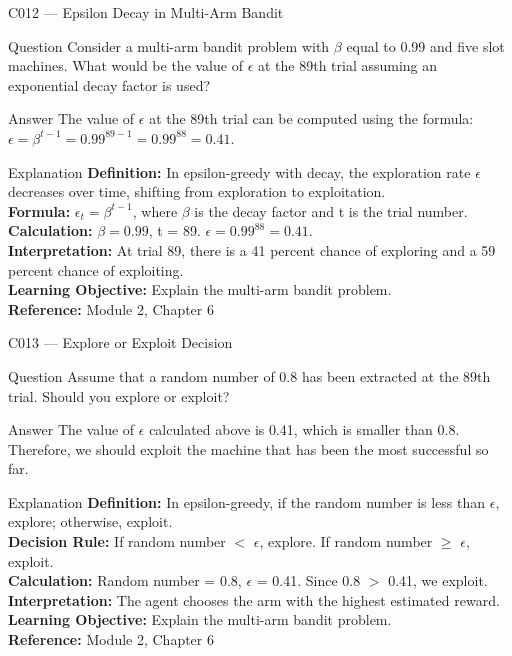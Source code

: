 \documentclass[aspectratio=169,8pt]{beamer}
\begin{document}
	\begin{frame}{C012 --- Epsilon Decay in Multi-Arm Bandit}
		\begin{block}{Question}
			Consider a multi-arm bandit problem with $\beta$ equal to 0.99 and five slot machines. What would be the value of $\epsilon$ at the 89th trial assuming an exponential decay factor is used?
		\end{block}
		\begin{block}{Answer}
			The value of $\epsilon$ at the 89th trial can be computed using the formula: $\epsilon = \beta^{t-1} = 0.99^{89-1} = 0.99^{88} = 0.41$.
		\end{block}
		\begin{block}{Explanation}
			\textbf{Definition:} In epsilon-greedy with decay, the exploration rate $\epsilon$ decreases over time, shifting from exploration to exploitation.\\
			\textbf{Formula:} $\epsilon_t = \beta^{t-1}$, where $\beta$ is the decay factor and t is the trial number.\\
			\textbf{Calculation:} $\beta = 0.99$, t = 89. $\epsilon = 0.99^{88} = 0.41$.\\
			\textbf{Interpretation:} At trial 89, there is a 41 percent chance of exploring and a 59 percent chance of exploiting.\\
			\textbf{Learning Objective:} Explain the multi-arm bandit problem.\\
			\textbf{Reference:} Module 2, Chapter 6
		\end{block}
	\end{frame}
	
	\begin{frame}{C013 --- Explore or Exploit Decision}
		\begin{block}{Question}
			Assume that a random number of 0.8 has been extracted at the 89th trial. Should you explore or exploit?
		\end{block}
		\begin{block}{Answer}
			The value of $\epsilon$ calculated above is 0.41, which is smaller than 0.8. Therefore, we should exploit the machine that has been the most successful so far.
		\end{block}
		\begin{block}{Explanation}
			\textbf{Definition:} In epsilon-greedy, if the random number is less than $\epsilon$, explore; otherwise, exploit.\\
			\textbf{Decision Rule:} If random number $<$ $\epsilon$, explore. If random number $\geq$ $\epsilon$, exploit.\\
			\textbf{Calculation:} Random number = 0.8, $\epsilon$ = 0.41. Since 0.8 $>$ 0.41, we exploit.\\
			\textbf{Interpretation:} The agent chooses the arm with the highest estimated reward.\\
			\textbf{Learning Objective:} Explain the multi-arm bandit problem.\\
			\textbf{Reference:} Module 2, Chapter 6
		\end{block}
	\end{frame}
	
\end{document}
